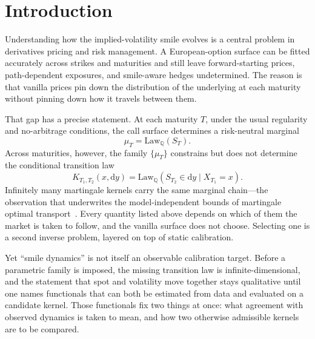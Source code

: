 \documentclass[11pt]{article}
\providecommand{\Qmeas}{\mathbb{Q}}
\providecommand{\1}{\mathbf 1}
\begin{document}
\section{Introduction}
\label{sec:intro}

Understanding how the implied-volatility smile evolves is a central problem in derivatives pricing
and risk management. A European-option surface can be fitted accurately across strikes and
maturities and still leave forward-starting prices, path-dependent exposures, and smile-aware hedges
undetermined. The reason is that vanilla prices pin down the distribution of the underlying at each
maturity without pinning down how it travels between them.

That gap has a precise statement. At each maturity $T$, under the usual regularity and no-arbitrage
conditions, the call surface determines a risk-neutral marginal~\cite{breeden1978}
\[
  \mu_T=\mathrm{Law}_{\Qmeas}(S_T).
\]
Across maturities, however, the family $\{\mu_T\}$ constrains but does not determine the conditional
transition law
\begin{equation}\label{eq:kernel-def}
  K_{T_1,T_2}(x,\mathrm{d}y)
  =
  \mathrm{Law}_{\Qmeas}
  \!\left(S_{T_2}\in\mathrm{d}y\mid X_{T_1}=x\right).
\end{equation}
Infinitely many martingale kernels carry the same marginal chain---the observation that underwrites
the model-independent bounds of martingale optimal transport~\cite{beiglbock2013}. Every quantity
listed above depends on which of them the market is taken to follow, and the vanilla surface does
not choose. Selecting one is a second inverse problem, layered on top of static calibration.

Yet ``smile dynamics'' is not itself an observable calibration target. Before a parametric family is
imposed, the missing transition law is infinite-dimensional, and the statement that spot and
volatility move together stays qualitative until one names functionals that can both be estimated
from data and evaluated on a candidate kernel. Those functionals fix two things at once: what
agreement with observed dynamics is taken to mean, and how two otherwise admissible kernels are to
be compared.
\end{document}
